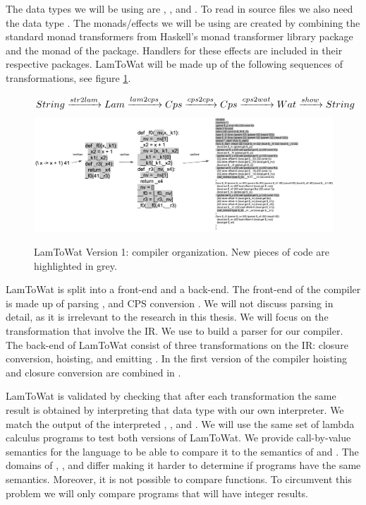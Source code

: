 The data types we will be using are , , and . To read in source files we also need the data type . The monads/effects we will be using are created by combining the standard monad transformers from Haskell's monad transformer library package  and the  monad of the  package. Handlers for these effects are included in their respective packages. LamToWat will be made up of the following sequences of transformations, see figure \ref{fig:lam2watv1org}.

\begin{figure}
\begin{gather*}
  String \xrightarrow{str2lam} Lam \xrightarrow{lam2cps} Cps \xrightarrow{cps2cps} Cps \xrightarrow{cps2wat} Wat \xrightarrow{show} String
\end{gather*}
\includegraphics[width=1\textwidth]{./img/cps.png}
\caption{LamToWat Version 1: compiler organization. New pieces of code are highlighted in grey.}
\label{fig:lam2watv1org}
\end{figure}

LamToWat is split into a front-end and a back-end. The front-end of the compiler is made up of parsing , and CPS conversion . We will not discuss  parsing in detail, as it is irrelevant to the research in this thesis. We will focus on the transformation that involve the IR. We use  to build a parser for our compiler. The back-end of LamToWat consist of three transformations on the IR: closure conversion, hoisting, and emitting . In the first version of the compiler hoisting and closure conversion are combined in .

LamToWat is validated by checking that after each transformation the same result is obtained by interpreting that data type with our own interpreter. We match the output of the interpreted , , and . We will use the same set of lambda calculus programs to test both versions of LamToWat. We provide call-by-value semantics for the  language to be able to compare it to the semantics of  and . The domains of , , and  differ making it harder to determine if programs have the same semantics. Moreover, it is not possible to compare functions. To circumvent this problem we will only compare programs that will have integer results.

